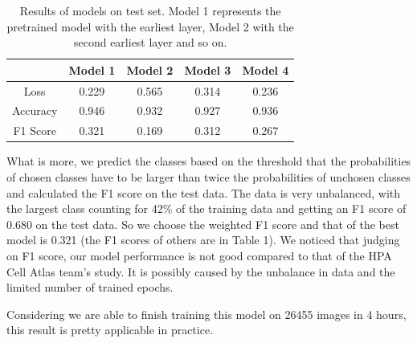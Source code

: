 \documentclass{article}
\begin{document}
  \begin{table}[h!]
    \centering
    
    \begin{tabular}{|c|c|c|c|c|}
        \hline
         &Model 1 & Model 2&Model 3&Model 4 \\
         \hline
         Loss & 0.229 & 0.565 & 0.314 & 0.236\\
         \hline
         Accuracy & 0.946 & 0.932 & 0.927 & 0.936\\
          \hline
         F1 Score & 0.321 & 0.169 & 0.312 & 0.267\\
         \hline
    \end{tabular}
    
    \caption {Results of models on test set. Model 1 represents the pretrained model with the earliest layer, Model 2 with the second earliest layer and so on. }
    
    \label{table:1}
    \end{table}

What is more, we predict the classes based on the threshold that the probabilities of chosen classes have to be larger than twice the probabilities of unchosen classes and calculated the F1 score on the test data. The data is very unbalanced, with the largest class counting for 42\% of the training data and getting an F1 score of 0.680 on the test data. So we choose the weighted F1 score and that of the best model is 0.321 (the F1 scores of others are in Table 1). We noticed that judging on F1 score, our model performance is not good compared to that of the HPA Cell Atlas team's study. It is possibly caused by the unbalance in data and the limited number of trained epochs.

Considering we are able to finish training this model on 26455 images in 4 hours, this result is pretty applicable in practice.
\end{document}
